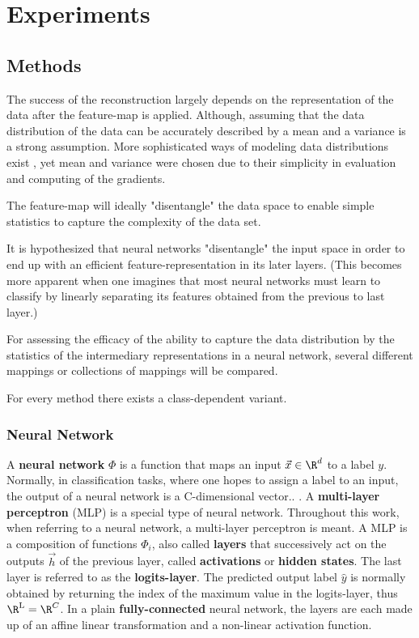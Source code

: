 
\chapter{Experiments}
\label{chap:Experiments} 

\section{Methods}

The success of the reconstruction largely depends on the representation of the data
after the feature-map is applied.
Although, assuming that the data distribution of the data can be accurately described
by a mean and a variance is a strong assumption.
More sophisticated ways of modeling data distributions exist
, yet mean and variance were chosen due to their simplicity in evaluation and computing of the gradients.

The feature-map will ideally "disentangle" the data space to enable 
simple statistics to capture the complexity of the data set.

It is hypothesized that neural networks "disentangle" the input space in order to end up with an efficient feature-representation in its later layers.
(This becomes more apparent when one imagines that most neural networks must learn to classify by linearly separating its features obtained from the previous to last layer.)


For assessing the efficacy of the ability to capture the data distribution by
the statistics of the intermediary representations in a neural network,
several different mappings or collections of mappings will be compared. 

For every method there exists a class-dependent variant.
\subsection{Neural Network}

A \textbf{neural network} $\Phi$ is a function that maps an input $\vec x \in \R^d$ to a label $y$.
Normally, in classification tasks, where one hopes to assign a label to an input, the output of a neural network is a C-dimensional vector..
. 
A \textbf{multi-layer perceptron} (MLP) is a special type of neural network. Throughout this work, when referring to a neural network, a multi-layer perceptron is meant. A MLP is a composition of functions $\Phi_i$, also called \textbf{layers} that successively act on the outputs $\vec h$ of the previous layer, called \textbf{activations} or \textbf{hidden states}. 
The last layer is referred to as the \textbf{logits-layer}. 
The predicted output label $\hat y$ is normally obtained by returning the index of the maximum value in the logits-layer, thus $\R^{\textnormal L} = \R^C$.
In a plain \textbf{fully-connected} neural network, the layers are each made up of an affine linear transformation and a non-linear activation function.

